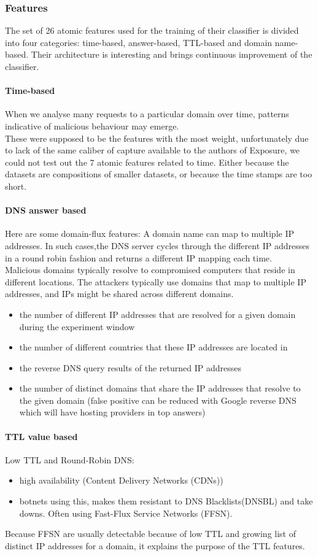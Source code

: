 \subsubsection{Features}
The set of 26 atomic features used for the training of their classifier is divided into four categories: time-based, answer-based, TTL-based and domain name-based. Their architecture is interesting and brings continuous improvement of the classifier.
\paragraph{Time-based}
When we analyse many requests to a particular domain over time, patterns indicative of malicious behaviour may emerge.\\
These were supposed to be the features with the most weight, unfortunately due to lack of the same caliber of capture available to the authors of Exposure, we could not test out the 7 atomic features related to time. Either because the datasets are compositions of smaller datasets, or because the time stamps are too short.
\paragraph{DNS answer based}
Here are some domain-flux features: A domain name can map to multiple IP addresses. In such cases,the DNS server cycles through the different IP addresses in a round robin fashion and returns a different IP mapping each time. \\
Malicious domains typically resolve to compromised computers that reside in different locations. The attackers typically use domains that map to multiple IP addresses, and IPs might be shared across different domains.
\begin{itemize}[noitemsep]
\item the number of different IP addresses that are resolved for a given domain during the experiment window
\item the number of different countries that these IP addresses are located in
\item the reverse DNS query results of the returned IP addresses
\item the number of distinct domains that share the IP addresses that resolve to the given domain (false positive can be reduced with Google reverse DNS which will have hosting providers in top answers)
\end{itemize}
\paragraph{TTL value based}
Low TTL and Round-Robin DNS: \\
\begin{itemize}[noitemsep]
\item high availability (Content Delivery Networks (CDNs))
\item botnets using this, makes them resistant to DNS Blacklists(DNSBL) and take downs. Often using Fast-Flux Service Networks (FFSN).
\end{itemize}
Because FFSN are usually detectable because of low TTL and growing list of distinct IP addresses for a domain, it explains the purpose of the TTL features.
